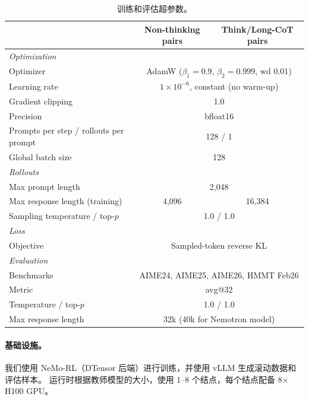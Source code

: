 \begin{table}[h]
  \centering
  \small
  \caption{训练和评估超参数。 }
  \label{tab:hparams}
  \begin{tabular}{lcc}
    \toprule
    & Non-thinking pairs & Think/Long-CoT pairs \\
    \midrule
    \multicolumn{3}{l}{\emph{Optimization}} \\
    Optimizer & \multicolumn{2}{c}{AdamW ($\beta_1{=}0.9$, $\beta_2{=}0.999$, wd $0.01$)} \\
    Learning rate & \multicolumn{2}{c}{$1\times10^{-6}$, constant (no warm-up)} \\
    Gradient clipping & \multicolumn{2}{c}{1.0} \\
    Precision & \multicolumn{2}{c}{bfloat16} \\
    Prompts per step / rollouts per prompt & \multicolumn{2}{c}{128 / 1} \\
    Global batch size & \multicolumn{2}{c}{128} \\
    \midrule
    \multicolumn{3}{l}{\emph{Rollouts}} \\
    Max prompt length & \multicolumn{2}{c}{2{,}048} \\
    Max response length (training) & 4{,}096 & 16{,}384 \\
    Sampling temperature / top-$p$ & \multicolumn{2}{c}{1.0 / 1.0} \\
    \midrule
    \multicolumn{3}{l}{\emph{Loss}} \\
    Objective & \multicolumn{2}{c}{Sampled-token reverse KL} \\
    \midrule
    \multicolumn{3}{l}{\emph{Evaluation}} \\
    Benchmarks & \multicolumn{2}{c}{AIME24, AIME25, AIME26, HMMT Feb26} \\
    Metric & \multicolumn{2}{c}{avg@32} \\
    Temperature / top-$p$ & \multicolumn{2}{c}{1.0 / 1.0} \\
    Max response length & \multicolumn{2}{c}{32k (40k for Nemotron model)} \\
    \bottomrule
  \end{tabular}
\end{table}





\paragraph{基础设施。}
我们使用 NeMo-RL（DTensor 后端）进行训练，并使用 vLLM 生成滚动数据和评估样本。  
运行时根据教师模型的大小，使用 1–8 个结点，每个结点配备 8$\times$ \,H100 GPU。





